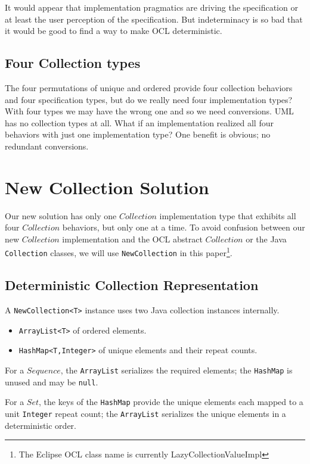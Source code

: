 \documentclass{llncs}
\begin{document}
It would appear that implementation pragmatics are driving the specification or at least the user perception of the specification. But indeterminacy is so bad that it would be good to find a way to make OCL deterministic.

\subsection{Four Collection types}

The four permutations of unique and ordered provide four collection behaviors and four specification types, but do we really need four implementation types? With four types we may have the wrong one and so we need conversions. UML~\cite{UML-2.5} has no collection types at all. What if an implementation realized all four behaviors with just one implementation type? One benefit is obvious; no redundant conversions.

\section{New Collection Solution}\label{Solutions}

Our new solution has only one $Collection$ implementation type that exhibits all four $Collection$ behaviors, but only one at a time. To avoid confusion between our new $Collection$ implementation and the OCL abstract $Collection$ or the Java \verb$Collection$ classes, we will use \verb$NewCollection$ in this paper\footnote{The Eclipse OCL class name is currently LazyCollectionValueImpl}.

\subsection{Deterministic Collection Representation}

A \verb$NewCollection<T>$ instance uses two Java collection instances internally.

\begin{itemize}
	\item \verb$ArrayList<T>$ of ordered elements.
	\item \verb$HashMap<T,Integer>$ of unique elements and their repeat counts.
\end{itemize}

For a $Sequence$, the \verb$ArrayList$ serializes the required elements; the \verb$HashMap$ is unused and may be \verb$null$.

For a $Set$, the keys of the \verb$HashMap$ provide the unique elements each mapped to a unit \verb$Integer$ repeat count; the \verb$ArrayList$ serializes the unique elements in a deterministic order.
\end{document}
